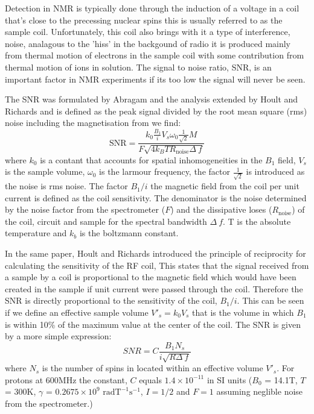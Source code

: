Detection in NMR is typically done through the induction of a voltage in a coil that's close
to the precessing nuclear spins this is usually referred to as the sample coil. Unfortunately,
this coil also brings with it a type of interference, noise, analagous to the 'hiss' in the backgound
of radio it is produced mainly from thermal motion of electrons in the sample coil with some contribution from thermal
motion of ions in solution. The signal to noise ratio, SNR, is an important factor in NMR experiments if its too low
the signal will never be seen.

The SNR was formulated by Abragam\citep{Abragam:1961vg} and the analysis extended by Hoult and
Richards\citep{Hoult:1976dw} and is defined as the peak signal divided by the root mean square (rms) noise including the magnetisation from  we find\citep{vanBentum:2007fda}:
\begin{equation}
  \text{SNR} = \frac{k_0\frac{B_1}{i}V_s\omega_0\frac{1}{\sqrt{2}}M}{F\sqrt{4k_BTR_{\text{noise}}\Delta~f}}
\end{equation}
where $k_0$ is a contant that accounts for spatial inhomogeneities in the $B_1$ field, $V_s$ is the sample volume,
$\omega_0$ is the larmour frequency, the factor $\frac{1}{\sqrt{2}}$ is introduced as the noise is rms noise. The
factor $B_1/i$ the magnetic field from the coil per unit current is defined as the coil sensitivity. The denominator is
the noise determined by the noise factor from the spectrometer ($F$) and the dissipative loses ($R_{\text{noise}}$) of
the coil, circuit and sample for the spectral bandwidth $\Delta~f$. T is the absolute temperature and $k_b$ is the
boltzmann constant.

In the same paper, Hoult and Richards introduced the principle of reciprocity for calculating the
sensitivity of the RF coil, This states that the signal received from a sample by a coil is proportional to the magnetic
field which would have been created in the sample if unit current were passed through the coil. Therefore the SNR is
directly proportional to the sensitivity of the coil, $B_1/i$. This can be seen if we define an
effective sample volume $V'_s = k_0V_s$ that is the volume in which $B_1$ is within 10\% of the maximum
value at the center of the coil. The SNR is given by a more simple expression\citep{vanBentum:2007fda}:
\begin{equation}
  SNR = C\frac{B_1N_s}{i\sqrt{R\Delta~f}}
\end{equation}
where $N_s$ is the number of spins in located within an effective volume $V'_s$.
For protons at 600MHz the constant, $C$ equals $1.4\times10^{-11}$ in SI units ($B_0$ = 14.1T, $T$ = 300K, $\gamma$ =
$0.2675\times10^9$ $\text{rad} \text{T}^{-1}\text{s}^{-1}$, $I = 1/2$ and $F = 1$ assuming neglible noise from the spectrometer.)

